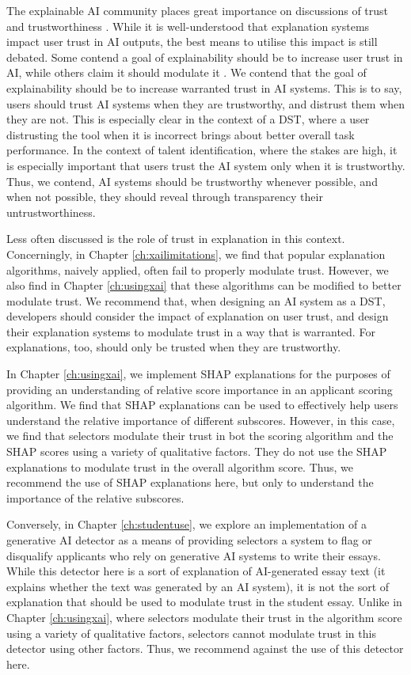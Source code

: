 The explainable AI community places great importance on discussions of trust and trustworthiness \cite{jacovi_formalizing_2021,vereschak_how_2021}. While it is well-understood that explanation systems impact user trust in AI outputs, the best means to utilise this impact is still debated. Some contend a goal of explainability should be to increase user trust in AI, while others claim it should modulate it \cite{jacovi_formalizing_2021,kruger_problem_2022}. We contend that the goal of explainability should be to increase warranted trust in AI systems. This is to say, users should trust AI systems when they are trustworthy, and distrust them when they are not.  This is especially clear in the context of a DST, where a user distrusting the tool when it is incorrect brings about better overall task performance. In the context of talent identification, where the stakes are high, it is especially important that users trust the AI system only when it is trustworthy. Thus, we contend, AI systems should be trustworthy whenever possible, and when not possible, they should reveal through transparency their untrustworthiness.

Less often discussed is the role of trust in explanation in this context. Concerningly, in Chapter \ref{ch:xailimitations}, we find that popular explanation algorithms, naively applied, often fail to properly modulate trust. However, we also find in Chapter \ref{ch:usingxai} that these algorithms can be modified to better modulate trust. We recommend that, when designing an AI system as a DST, developers should consider the impact of explanation on user trust, and design their explanation systems to modulate trust in a way that is warranted. For explanations, too, should only be trusted when they are trustworthy.

In Chapter \ref{ch:usingxai}, we implement SHAP explanations for the purposes of providing an understanding of relative score importance in an applicant scoring algorithm. We find that SHAP explanations can be used to effectively help users understand the relative importance of different subscores. However, in this case, we find that selectors modulate their trust in bot the scoring algorithm and the SHAP scores using a variety of qualitative factors. They do not use the SHAP explanations to modulate trust in the overall algorithm score. Thus, we recommend the use of SHAP explanations here, but only to understand the importance of the relative subscores.

Conversely, in Chapter \ref{ch:studentuse}, we explore an implementation of a generative AI detector as a means of providing selectors a system to flag or disqualify applicants who rely on generative AI systems to write their essays. While this detector here is a sort of explanation of AI-generated essay text (it explains whether the text was generated by an AI system), it is not the sort of explanation that should be used to modulate trust in the student essay. Unlike in Chapter \ref{ch:usingxai}, where selectors modulate their trust in the algorithm score using a variety of qualitative factors, selectors cannot modulate trust in this detector using other factors. Thus, we recommend against the use of this detector here.

